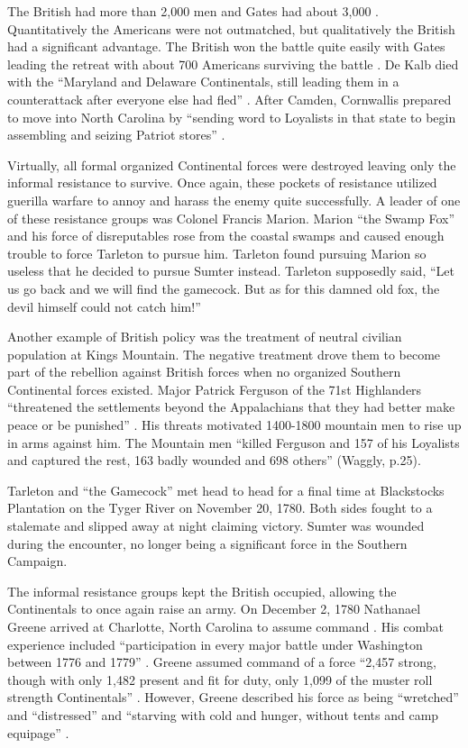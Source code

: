   The British had more than 2,000 men and Gates had
about 3,000 \cite[p.19]{weigley_partisan_1970}.  Quantitatively the Americans were not outmatched,
but qualitatively the British had a significant advantage.  The British won the
battle quite easily with Gates leading the retreat with about 700 Americans
surviving the battle \cite[p.21]{weigley_partisan_1970}.  De Kalb died with the “Maryland and
Delaware Continentals, still leading them in a counterattack after everyone else
had fled” \cite[p.21]{weigley_partisan_1970}.  After Camden, Cornwallis prepared to move into North
Carolina by “sending word to Loyalists in that state to begin assembling and
seizing Patriot stores” \cite[p.27]{woodward_comparative_2002}.

Virtually, all formal organized Continental forces were destroyed leaving only
the informal resistance to survive.  Once again, these pockets of resistance
utilized guerilla warfare to annoy and harass the enemy quite successfully.  A
leader of one of these resistance groups was Colonel Francis Marion.  Marion
“the Swamp Fox” and his force of disreputables rose from the coastal swamps and
caused enough trouble to force Tarleton to pursue him.  Tarleton found pursuing
Marion so useless that he decided to pursue Sumter instead.  Tarleton supposedly
said, “Let us go back and we will find the gamecock.  But as for this damned old
fox, the devil himself could not catch him!” \cite[p.23]{weigley_partisan_1970}

Another example of British policy was the treatment of neutral civilian
population at Kings Mountain.  The negative treatment drove them to become part
of the rebellion against British forces when no organized Southern Continental
forces existed.  Major Patrick Ferguson of the 71st Highlanders “threatened the
settlements beyond the Appalachians that they had better make peace or be
punished” \cite[p.24]{weigley_partisan_1970}.  His threats motivated 1400-1800 mountain men to
rise up in arms against him.  The Mountain men “killed Ferguson and 157 of his
Loyalists and captured the rest, 163 badly wounded and 698 others” (Waggly,
p.25).  

Tarleton and “the Gamecock” met head to head for a final time at Blackstocks
Plantation on the Tyger River on November 20, 1780.  Both sides fought to a
stalemate and slipped away at night claiming victory.  Sumter was wounded during
the encounter, no longer being a significant force in the Southern Campaign. 

The informal resistance groups kept the British occupied, allowing the
Continentals to once again raise an army.  On December 2, 1780 Nathanael Greene
arrived at Charlotte, North Carolina to assume command \cite[p.22]{moncure_cowpens_1996}.
His combat experience included “participation in every major battle under
Washington between 1776 and 1779” \cite[5]{babits_devil_2001}.  Greene assumed command of a
force “2,457 strong, though with only 1,482 present and fit for duty, only 1,099
of the muster roll strength Continentals”  \cite[27]{weigley_partisan_1970}.   However, Greene
described his force as being “wretched” and “distressed” and “starving with cold
and hunger, without tents and camp equipage” \cite[23]{moncure_cowpens_1996}. 

